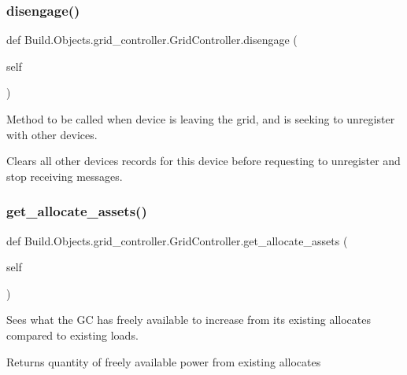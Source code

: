 \subsubsection{\texorpdfstring{disengage()}{disengage()}}
{\footnotesize\ttfamily def Build.\+Objects.\+grid\+\_\+controller.\+Grid\+Controller.\+disengage (\begin{DoxyParamCaption}\item[{}]{self }\end{DoxyParamCaption})}



Method to be called when device is leaving the grid, and is seeking to unregister with other devices. 

Clears all other devices\textquotesingle{} records for this device before requesting to unregister and stop receiving messages. \mbox{\label{class_build_1_1_objects_1_1grid__controller_1_1_grid_controller_a739bdc06f47603df13fa105dfcfaea10}} 
\subsubsection{\texorpdfstring{get\+\_\+allocate\+\_\+assets()}{get\_allocate\_assets()}}
{\footnotesize\ttfamily def Build.\+Objects.\+grid\+\_\+controller.\+Grid\+Controller.\+get\+\_\+allocate\+\_\+assets (\begin{DoxyParamCaption}\item[{}]{self }\end{DoxyParamCaption})}



Sees what the GC has freely available to increase from its existing allocates compared to existing loads. 

\begin{DoxyReturn}{Returns}
quantity of freely available power from existing allocates 
\end{DoxyReturn}
\mbox{\label{class_build_1_1_objects_1_1grid__controller_1_1_grid_controller_ad984f42fc7530884d3c95fd1d4e5067e}} 
